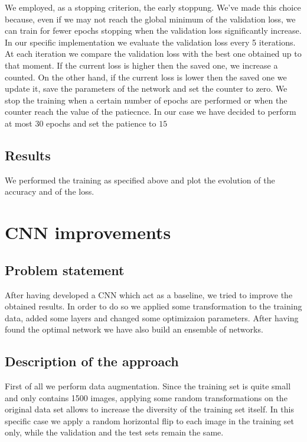 \documentclass[12pt, a4paper]{report}
\begin{document}
We employed, as a stopping criterion, the early stoppung. We've made this choice because, even if we may not reach the global minimum of the validation loss, we can train for fewer epochs stopping when the validation loss significantly increase.\\
In our specific implementation we evaluate the validation loss every 5 iterations. At each iteration we compare the validation loss with the best one obtained up to that moment. If the current loss is higher then the saved one, we increase a counted. On the other hand, if the current loss is lower then the saved one we update it, save the parameters of the network and set the counter to zero. We stop the training when a certain number of epochs are performed or when the counter reach the value of the patiecnce. In our case we have decided to perform at most $30$ epochs and set the patience to $15$
	
\subsection*{Results}

We performed the training as specified above and plot the evolution of the accuracy and of the loss.

\begin{figure}[h!]
	\centering
	\label{fig:baselineaccuracy}
	\label{fig:baselineloss}
\end{figure}

\section{CNN improvements}
\subsection*{Problem statement}
After having developed a CNN which act as a baseline, we tried to improve the obtained results. In order to do so we applied some transformation to the training data, added some layers and changed some optimizaion parameters. After having found the optimal network we have also build an ensemble of networks.

\subsection*{Description of the approach}
First of all we perform data augmentation. Since the training set is quite small and only contains 1500 images, applying some random transformations on the original data set allows to increase the diversity of the training set itself. In this specific case we apply a random horizontal flip to each image in the training set only, while the validation and the test sets remain the same.
\end{document}
